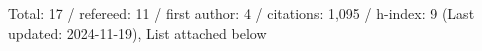 Total: 17 / refereed: 11 / first author: 4 / citations: 1,095 / h-index: 9 (Last updated: 2024-11-19), List attached below